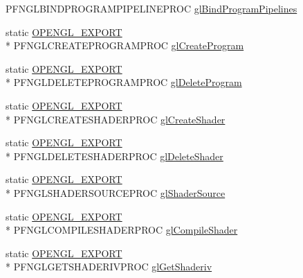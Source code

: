 \begin{DoxyCompactItemize}
P\+F\+N\+G\+L\+B\+I\+N\+D\+P\+R\+O\+G\+R\+A\+M\+P\+I\+P\+E\+L\+I\+N\+E\+P\+R\+O\+C \hyperlink{class_agmd_1_1_g_l_driver_ac09444ad917d9dcd385acddb2dd0973e}{gl\+Bind\+Program\+Pipelines}
\item 
static \hyperlink{_config_8h_a77401aa3bc0a379879047c1bd30f262e}{O\+P\+E\+N\+G\+L\+\_\+\+E\+X\+P\+O\+R\+T} \\*
P\+F\+N\+G\+L\+C\+R\+E\+A\+T\+E\+P\+R\+O\+G\+R\+A\+M\+P\+R\+O\+C \hyperlink{class_agmd_1_1_g_l_driver_a94461a10b539ca04d570f396ad78c42f}{gl\+Create\+Program}
\item 
static \hyperlink{_config_8h_a77401aa3bc0a379879047c1bd30f262e}{O\+P\+E\+N\+G\+L\+\_\+\+E\+X\+P\+O\+R\+T} \\*
P\+F\+N\+G\+L\+D\+E\+L\+E\+T\+E\+P\+R\+O\+G\+R\+A\+M\+P\+R\+O\+C \hyperlink{class_agmd_1_1_g_l_driver_a7821d8981f4821ace4e176010bdee544}{gl\+Delete\+Program}
\item 
static \hyperlink{_config_8h_a77401aa3bc0a379879047c1bd30f262e}{O\+P\+E\+N\+G\+L\+\_\+\+E\+X\+P\+O\+R\+T} \\*
P\+F\+N\+G\+L\+C\+R\+E\+A\+T\+E\+S\+H\+A\+D\+E\+R\+P\+R\+O\+C \hyperlink{class_agmd_1_1_g_l_driver_a7051646731a6b09a4f99078422656ff4}{gl\+Create\+Shader}
\item 
static \hyperlink{_config_8h_a77401aa3bc0a379879047c1bd30f262e}{O\+P\+E\+N\+G\+L\+\_\+\+E\+X\+P\+O\+R\+T} \\*
P\+F\+N\+G\+L\+D\+E\+L\+E\+T\+E\+S\+H\+A\+D\+E\+R\+P\+R\+O\+C \hyperlink{class_agmd_1_1_g_l_driver_a417ccce16aa008039a02934b6dd934c4}{gl\+Delete\+Shader}
\item 
static \hyperlink{_config_8h_a77401aa3bc0a379879047c1bd30f262e}{O\+P\+E\+N\+G\+L\+\_\+\+E\+X\+P\+O\+R\+T} \\*
P\+F\+N\+G\+L\+S\+H\+A\+D\+E\+R\+S\+O\+U\+R\+C\+E\+P\+R\+O\+C \hyperlink{class_agmd_1_1_g_l_driver_a11c8a6eceffdbf971f8aa954bef09d5e}{gl\+Shader\+Source}
\item 
static \hyperlink{_config_8h_a77401aa3bc0a379879047c1bd30f262e}{O\+P\+E\+N\+G\+L\+\_\+\+E\+X\+P\+O\+R\+T} \\*
P\+F\+N\+G\+L\+C\+O\+M\+P\+I\+L\+E\+S\+H\+A\+D\+E\+R\+P\+R\+O\+C \hyperlink{class_agmd_1_1_g_l_driver_acfb8dab4eadade450f17561c094f5372}{gl\+Compile\+Shader}
\item 
static \hyperlink{_config_8h_a77401aa3bc0a379879047c1bd30f262e}{O\+P\+E\+N\+G\+L\+\_\+\+E\+X\+P\+O\+R\+T} \\*
P\+F\+N\+G\+L\+G\+E\+T\+S\+H\+A\+D\+E\+R\+I\+V\+P\+R\+O\+C \hyperlink{class_agmd_1_1_g_l_driver_a39fb1c4c4cf5db5fb814ccd672008de7}{gl\+Get\+Shaderiv}

\end{DoxyCompactItemize}
